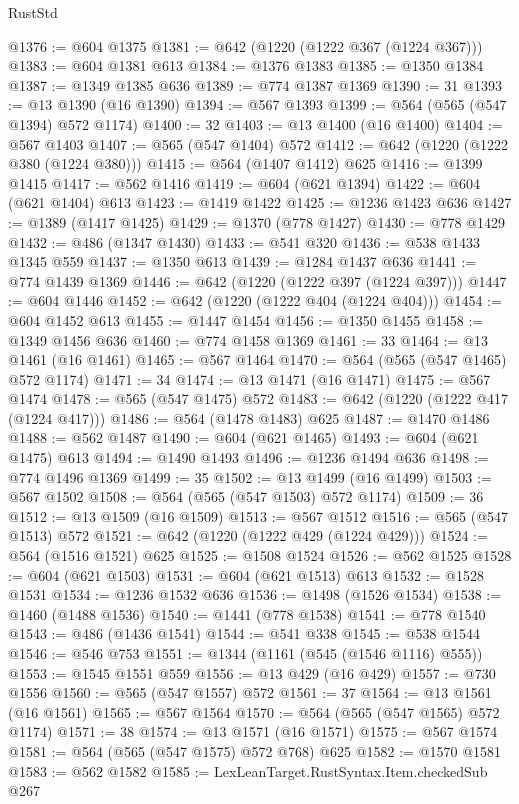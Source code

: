 \begin{lexlean}{RustStd}
\begin{coremodule}
@1376 := @604 @1375
@1381 := @642 (@1220 (@1222 @367 (@1224 @367)))
@1383 := @604 @1381 @613
@1384 := @1376 @1383
@1385 := @1350 @1384
@1387 := @1349 @1385 @636
@1389 := @774 @1387 @1369
@1390 := 31
@1393 := @13 @1390 (@16 @1390)
@1394 := @567 @1393
@1399 := @564 (@565 (@547 @1394) @572 @1174)
@1400 := 32
@1403 := @13 @1400 (@16 @1400)
@1404 := @567 @1403
@1407 := @565 (@547 @1404) @572
@1412 := @642 (@1220 (@1222 @380 (@1224 @380)))
@1415 := @564 (@1407 @1412) @625
@1416 := @1399 @1415
@1417 := @562 @1416
@1419 := @604 (@621 @1394)
@1422 := @604 (@621 @1404) @613
@1423 := @1419 @1422
@1425 := @1236 @1423 @636
@1427 := @1389 (@1417 @1425)
@1429 := @1370 (@778 @1427)
@1430 := @778 @1429
@1432 := @486 (@1347 @1430)
@1433 := @541 @320
@1436 := @538 @1433 @1345 @559
@1437 := @1350 @613
@1439 := @1284 @1437 @636
@1441 := @774 @1439 @1369
@1446 := @642 (@1220 (@1222 @397 (@1224 @397)))
@1447 := @604 @1446
@1452 := @642 (@1220 (@1222 @404 (@1224 @404)))
@1454 := @604 @1452 @613
@1455 := @1447 @1454
@1456 := @1350 @1455
@1458 := @1349 @1456 @636
@1460 := @774 @1458 @1369
@1461 := 33
@1464 := @13 @1461 (@16 @1461)
@1465 := @567 @1464
@1470 := @564 (@565 (@547 @1465) @572 @1174)
@1471 := 34
@1474 := @13 @1471 (@16 @1471)
@1475 := @567 @1474
@1478 := @565 (@547 @1475) @572
@1483 := @642 (@1220 (@1222 @417 (@1224 @417)))
@1486 := @564 (@1478 @1483) @625
@1487 := @1470 @1486
@1488 := @562 @1487
@1490 := @604 (@621 @1465)
@1493 := @604 (@621 @1475) @613
@1494 := @1490 @1493
@1496 := @1236 @1494 @636
@1498 := @774 @1496 @1369
@1499 := 35
@1502 := @13 @1499 (@16 @1499)
@1503 := @567 @1502
@1508 := @564 (@565 (@547 @1503) @572 @1174)
@1509 := 36
@1512 := @13 @1509 (@16 @1509)
@1513 := @567 @1512
@1516 := @565 (@547 @1513) @572
@1521 := @642 (@1220 (@1222 @429 (@1224 @429)))
@1524 := @564 (@1516 @1521) @625
@1525 := @1508 @1524
@1526 := @562 @1525
@1528 := @604 (@621 @1503)
@1531 := @604 (@621 @1513) @613
@1532 := @1528 @1531
@1534 := @1236 @1532 @636
@1536 := @1498 (@1526 @1534)
@1538 := @1460 (@1488 @1536)
@1540 := @1441 (@778 @1538)
@1541 := @778 @1540
@1543 := @486 (@1436 @1541)
@1544 := @541 @338
@1545 := @538 @1544
@1546 := @546 @753
@1551 := @1344 (@1161 (@545 (@1546 @1116) @555))
@1553 := @1545 @1551 @559
@1556 := @13 @429 (@16 @429)
@1557 := @730 @1556
@1560 := @565 (@547 @1557) @572
@1561 := 37
@1564 := @13 @1561 (@16 @1561)
@1565 := @567 @1564
@1570 := @564 (@565 (@547 @1565) @572 @1174)
@1571 := 38
@1574 := @13 @1571 (@16 @1571)
@1575 := @567 @1574
@1581 := @564 (@565 (@547 @1575) @572 @768) @625
@1582 := @1570 @1581
@1583 := @562 @1582
@1585 := LexLeanTarget.RustSyntax.Item.checkedSub @267

\end{coremodule}
\end{lexlean}
